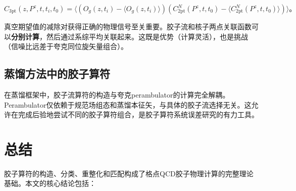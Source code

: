 \documentclass[12pt,a4paper]{ctexart}
\theoremstyle{definition}
\begin{document}
\begin{equation}
C_{\text{3pt}}(z, P^z, t, t_i, t_0) = \langle (O_g(z, t_i) - \langle O_g(z, t_i) \rangle)(C^N_{\text{2pt}}(P^z, t, t_0) - \langle C^N_{\text{2pt}}(P^z, t, t_0) \rangle) \rangle。
\label{eq:disconnected_3pt}
\end{equation}

真空期望值的减除对获得正确的物理信号至关重要。胶子流和核子两点关联函数可以\textbf{分别计算}，然后通过系综平均关联起来。这既是优势（计算灵活），也是挑战（信噪比远差于夸克同位旋矢量组合）。

\subsection{蒸馏方法中的胶子算符}

在蒸馏框架中\cite{Peardon2009,Egerer2021a}，胶子流算符的构造与夸克perambulator的计算完全解耦。Perambulator仅依赖于规范场组态和蒸馏本征矢，与具体的胶子流选择无关。这允许在完成后验地尝试不同的胶子算符组合，是胶子算符系统误差研究的有力工具。

\section{总结}

胶子算符的构造、分类、重整化和匹配构成了格点QCD胶子物理计算的完整理论基础。本文的核心结论包括：
\end{document}
